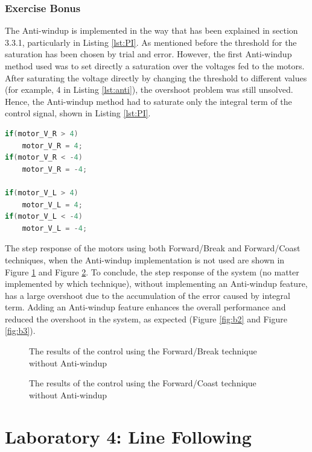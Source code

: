\documentclass[english]{article}
\begin{document}
\subsubsection{Exercise Bonus}
The Anti-windup is implemented in the way that has been explained in
section 3.3.1, particularly in Listing \ref{lst:PI}. As mentioned before the
threshold for the saturation has been chosen by trial and error. 
However, the first Anti-windup method used was to set directly a 
saturation over the voltages fed to the motors. After saturating the
voltage directly by changing the threshold to different values 
(for example, 4 in Listing \ref{lst:anti}), the overshoot problem was still unsolved. 
Hence,  the Anti-windup method had to saturate only the
 integral term of the control signal, shown 
 in Listing \ref{lst:PI}. 
\begin{lstlisting}[language=C, caption={wrong Anti-windup method}, label={lst:anti} ]
if(motor_V_R > 4)
    motor_V_R = 4;
if(motor_V_R < -4)
    motor_V_R = -4;

if(motor_V_L > 4)
    motor_V_L = 4;
if(motor_V_L < -4)
    motor_V_L = -4;
\end{lstlisting}
The step response of the motors using both Forward/Break and
Forward/Coast techniques, when the Anti-windup implementation
is not used are shown in Figure \ref{fig:b4} and Figure \ref{fig:b5}. To conclude, 
the step response of the system (no matter implemented by which technique),
 without implementing an Anti-windup feature, has a large overshoot due
  to the accumulation of the error caused by integral term. Adding an 
  Anti-windup feature enhances the overall performance and reduced the 
  overshoot in the system, as expected (Figure \ref{fig:b2} and Figure \ref{fig:b3}).
\begin{figure}[tbh]
    \centering
    
    \caption{The results of the control using the Forward/Break technique without Anti-windup} 
    \label{fig:b4}
\end{figure} 
\newpage
\begin{figure}[tbh]
    \centering
    
    \caption{The results of the control using the Forward/Coast technique without Anti-windup} 
    \label{fig:b5}
\end{figure} 

\newpage
\section{Laboratory 4: Line Following}
\end{document}
